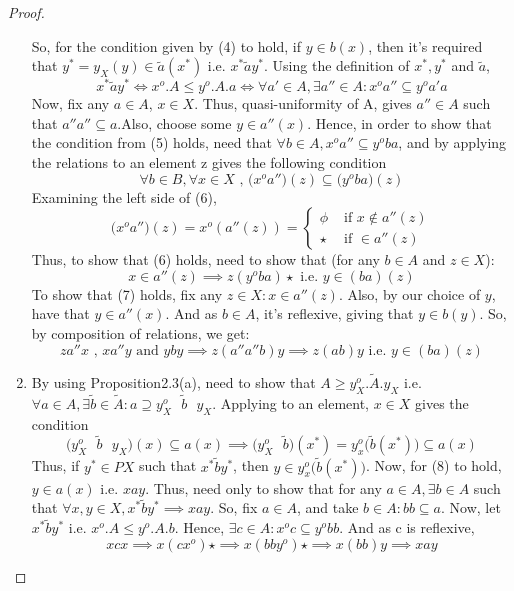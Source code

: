 \documentclass[18pt,a4paper]{article}
\theoremstyle{definition}
\begin{document}
\begin{proof}
\begin{enumerate}[label=(\alph*)]
		So, for the condition given by (4) to hold, if $y \in b(x)$, then it's required that
		$y^*=y_X(y) \in \tilde{a} (x^*)$ i.e. $x^* \tilde{a}y^*$. Using the definition of $x^*,y^*$
		and $\tilde{a}$,
		\begin{equation} x^* \tilde{a}y^* \iff x^o.A\leq y^o.A.a \iff
		\forall a' \in A, \exists a'' \in A: x^oa'' \subseteq y^oa'a  \end{equation}
		Now, fix any $a \in A$, $x\in X$. Thus, quasi-uniformity of A, gives $a'' \in A$ such that
		$a''a''\subseteq a$.Also, choose some $y \in a''(x)$. Hence, in
		order to show that the condition from (5) holds, need that
		$\forall b \in A, x^o a'' \subseteq y^oba$, and by applying the relations to an element z
		gives the following condition
		\begin{equation} \forall b \in B, \forall x \in X \text{ , }
		\big(x^oa''\big)(z) \subseteq \big(y^oba\big)(z) \end{equation}
		Examining the left side of (6),
		\[ \big( x^oa''\big)(z)=x^o (a''(z))= \begin{cases}
			\phi &\text{ if } x \notin a''(z) \\
			\star & \text{ if } \in a''(z)
		\end{cases} \]
		Thus, to show that (6) holds, need to show that (for any $b\in A$ and $z \in X$):
		\begin{equation} x \in a''(z) \implies z(y^oba)\star \text{ i.e. } y\in(ba)(z)
		\end{equation}
		To show that (7) holds, fix any $z\in X: x \in a''(z)$. Also, by our choice of $y$,
		have that $y \in a''(x)$. And as $b\in A$, it's reflexive, giving that $y \in b(y)$.
		So, by composition of relations, we get:
		\[ za''x \text{ , }  xa''y \text{ and } yby \implies z(a''a''b)y \implies z(ab)y \text{ i.e. }
		y \in (ba)(z)\]
	\item By using Proposition2.3(a), need to show that $A\geq y_X^o.\tilde{A}.y_X$ i.e. $\forall
		a\in A, \exists \tilde{b}\in \tilde{A} :  a \supseteq y_X^o \text{ } \tilde{b} \text{ } y_X $.
		Applying to an element, $x\in X$ gives the condition
		\begin{equation}
			\Big( y_X^o \text{ } \tilde{b} \text{ } y_X \Big)(x) \subseteq a(x)
			\implies \Big( y_X^o \text{ } \tilde{b} \Big) (x^*)= y_x^o
			\Big(\tilde{b}(x^*)\Big) \subseteq a(x)
		\end{equation}
		Thus, if $y^* \in PX$ such that $x^* \tilde{b} y^*$, then
		$y \in y_x^o\Big(\tilde{b}(x^*)\Big)$. Now, for (8) to hold, $y \in a(x)$ i.e. $xay$. Thus,
		need only to show that for any $a\in A, \exists b \in A $ such that $\forall x,y \in X,
		x^* \tilde{b}y^* \implies xay $. So, fix $a\in A$, and take $b \in A: bb \subseteq a$.
		Now, let $x^* \tilde{b}y^*$ i.e. $x^o.A \leq y^o .A .b$.
		Hence, $\exists c \in A: x^oc \subseteq y^o bb$. And as c is reflexive,
		\[ xcx \implies x(cx^o)\star \implies x(bby^o)\star \implies x(bb)y \implies xay \]




\end{enumerate}
\end{proof}
\end{document}
